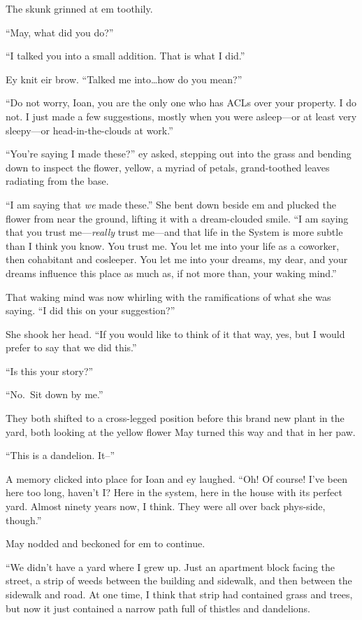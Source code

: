 The skunk grinned at em toothily.

``May, what did you do?''

``I talked you into a small addition. That is what I did.''

Ey knit eir brow. ``Talked me into\ldots how do you mean?''

``Do not worry, Ioan, you are the only one who has ACLs over your property. I do not. I just made a few suggestions, mostly when you were asleep---or at least very sleepy---or head-in-the-clouds at work.''

``You're saying I made these?'' ey asked, stepping out into the grass and bending down to inspect the flower, yellow, a myriad of petals, grand-toothed leaves radiating from the base.

``I am saying that \emph{we} made these.'' She bent down beside em and plucked the flower from near the ground, lifting it with a dream-clouded smile. ``I am saying that you trust me---\emph{really} trust me---and that life in the System is more subtle than I think you know. You trust me. You let me into your life as a coworker, then cohabitant and cosleeper. You let me into your dreams, my dear, and your dreams influence this place as much as, if not more than, your waking mind.''

That waking mind was now whirling with the ramifications of what she was saying. ``I did this on your suggestion?''

She shook her head. ``If you would like to think of it that way, yes, but I would prefer to say that we did this.''

``Is this your story?''

``No.~Sit down by me.''

They both shifted to a cross-legged position before this brand new plant in the yard, both looking at the yellow flower May turned this way and that in her paw.

``This is a dandelion. It--''

A memory clicked into place for Ioan and ey laughed. ``Oh! Of course! I've been here too long, haven't I? Here in the system, here in the house with its perfect yard. Almost ninety years now, I think. They were all over back phys-side, though.''

May nodded and beckoned for em to continue.

``We didn't have a yard where I grew up. Just an apartment block facing the street, a strip of weeds between the building and sidewalk, and then between the sidewalk and road. At one time, I think that strip had contained grass and trees, but now it just contained a narrow path full of thistles and dandelions.

